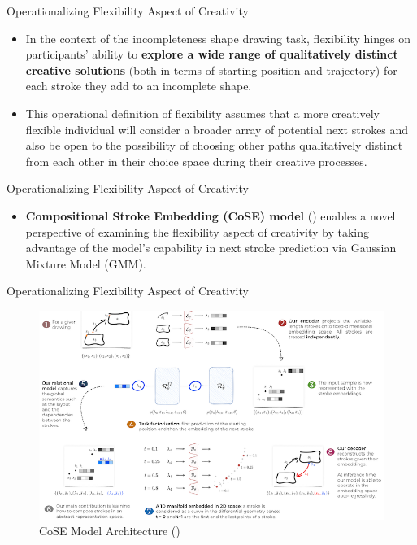 \documentclass[pdf]{beamer}
\begin{document}
\begin{frame}{Operationalizing Flexibility Aspect of Creativity}
\begin{itemize}
    \item<1-> In the context of the incompleteness shape drawing task, flexibility hinges on participants' ability to \textbf{explore a wide range of qualitatively distinct creative solutions} (both in terms of starting position and trajectory) for each stroke they add to an incomplete shape. 
    \vspace{1em}
    \item<2-> This operational definition of flexibility assumes that a more creatively flexible individual will consider a broader array of potential next strokes and also be open to the possibility of choosing other paths qualitatively distinct from each other in their choice space during their creative processes. 
\end{itemize}
\end{frame}

\begin{frame}{Operationalizing Flexibility Aspect of Creativity}
\begin{itemize}
    \item \textbf{Compositional Stroke Embedding (CoSE) model} (\cite{aksan_cose_2021}) enables a novel perspective of examining the flexibility aspect of creativity by taking advantage of the model’s capability in next stroke prediction via Gaussian Mixture Model (GMM).
\end{itemize}
\end{frame}

\begin{frame}{Operationalizing Flexibility Aspect of Creativity}
\begin{figure}
    \centering
    \includegraphics[height=0.75\textheight, keepaspectratio]{screenshots/CoSE Model Architecture.png}
    \caption{CoSE Model Architecture (\cite{aksan_cose_2021})}
\end{figure}
\end{frame}
\end{document}
